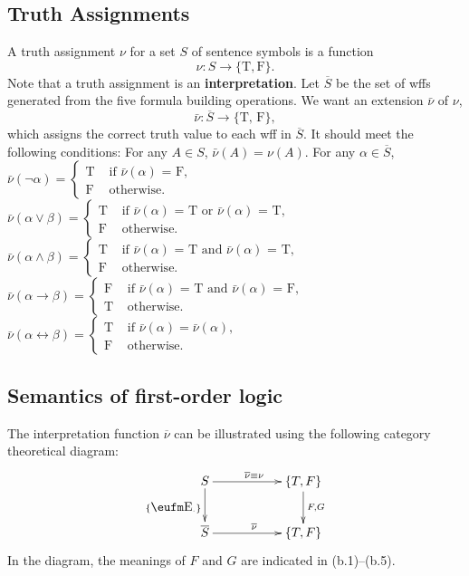 \subsection{Truth Assignments}
A {truth assignment} $\nu$ for a set $S$ of sentence
symbols is a function
  \[ \nu: {S} \rightarrow \{\mbox{T}, \mbox{F}\}. \]
Note that a truth assignment is an {\bf{}interpretation}.
Let $\overline{S}$ be the set of wffs generated from the five
formula building operations.
We want an extension $\bar{\nu}$ of $\nu$,
	\[ \bar{\nu}: \overline{S} \rightarrow \{\mbox{T, F}\},\]
which assigns the correct truth value to each wff in $\overline{S}$.
It should meet the following conditions:
\ben
\w For any $A \in {S}$, $\bar{\nu}(A) = \nu(A)$.
\w For any $\alpha \in \overline{S}$,
	\ben
	\w $\bar{\nu}(\neg\alpha) = \left\{\begin{array}{ll}
		\mbox{T} & \mbox{\ if $\bar{\nu}(\alpha)$ = F},\\
		\mbox{F} & \mbox{\ otherwise}.
		\end{array}\right.$
	\w $\bar{\nu}(\alpha\vee\beta) =
	    \left\{\begin{array}{ll}
		\mbox{T} & \mbox{\ if $\bar{\nu}(\alpha)$ = T or 
					$\bar{\nu}(\alpha)$ = T},\\
		\mbox{F} & \mbox{\ otherwise}.
		\end{array}\right.$
	\w $\bar{\nu}(\alpha\wedge\beta) =
	    \left\{\begin{array}{ll}
		\mbox{T} & \mbox{\ if $\bar{\nu}(\alpha)$ = T and
		  $\bar{\nu}(\alpha)$ = T},\\
		\mbox{F} & \mbox{\ otherwise}.
		\end{array}\right.$
	\w $\bar{\nu}(\alpha\rightarrow\beta) =
	 \left\{\begin{array}{ll}
	\mbox{F} & \mbox{\ if $\bar{\nu}(\alpha)$ = T and
		$\bar{\nu}(\alpha)$ = F},\\
		\mbox{T} & \mbox{\ otherwise}.
			\end{array}\right.$
	\w $\bar{\nu}(\alpha\leftrightarrow\beta) = 
               \left\{\begin{array}{ll}
               \mbox{T}&\mbox{\ if $\bar{\nu}(\alpha) = \bar{\nu}(\alpha)$},\\
		\mbox{F} & \mbox{\ otherwise}.
		\end{array}\right.$
	\een
\een

\subsection{Semantics of first-order logic}
The interpretation function $\overline\nu$ can be illustrated using
the following category theoretical diagram:
	\[ \xymatrix{
		{S} \ar[d]_{\{\EE_\cdot\}} 
		\ar[rr]^{\overline{\nu} \equiv \nu}  
			& &  \{T, F\}
			\ar[d]^{F,G} \\
		\overline{S} 
		\ar[rr]^{\overline{\nu}} & & \{T, F\}
	}\]
In the diagram, the meanings of  $F$ and $G$ are indicated in (b.1)--(b.5).


